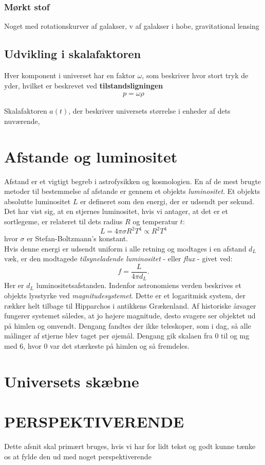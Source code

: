 \subsubsection{Mørkt stof}
Noget med rotationskurver af galakser, v af galakser i hobe, gravitational lensing

\subsection{Udvikling i skalafaktoren}
Hver komponent i universet har en faktor $\omega$, som beskriver hvor stort tryk de yder, hvilket er beskrevet ved \textbf{tilstandsligningen}
\begin{align}
	p=\omega \rho
\end{align}

Skalafaktoren $a(t)$, der beskriver universets størrelse i enheder af dets nuværende, 

\section{Afstande og luminositet}
Afstand er et vigtigt begreb i astrofysikken og kosmologien. En af de mest brugte metoder til bestemmelse af afstande er gennem et objekts \textit{luminositet}. Et objekts absolutte luminositet $L$ er defineret som den energi, der er udsendt per sekund. Det har vist sig, at en stjernes luminositet, hvis vi antager, at det er et sortlegeme, er relateret til dets radius $R$ og temperatur $t$:
\begin{equation}
L = 4\pi\sigma R^2T^4 \propto R^2 T^4
\end{equation}
hvor $\sigma$ er Stefan-Boltzmann's konstant. \\
Hvis denne energi er udsendt uniform i alle retning og modtages i en afstand $d_L$ væk, er den modtagede \textit{tilsyneladende luminositet} - eller \textit{flux} - givet ved:
\begin{equation}
f = \frac{L}{4\pi d_L}.
\end{equation}
Her er $d_L$ luminositetsafstanden. Indenfor astronomiens verden beskrives et objekts lysstyrke ved \textit{magnitudesystemet}. Dette er et logaritmisk system, der rækker helt tilbage til Hipparchos i antikkens Grækenland. Af historiske årsager fungerer systemet således, at jo højere magnitude, desto svagere ser objektet ud på himlen og omvendt. Dengang fandtes der ikke teleskoper, som i dag, så alle målinger af stjerne blev taget per øjemål. Dengang gik skalaen fra 0 til og mg med 6, hvor 0 var det stærkeste på himlen og så fremdeles. 

\section{Universets skæbne}

\section{PERSPEKTIVERENDE}
Dette afsnit skal primært bruges, hvis vi har for lidt tekst og godt kunne tænke os at fylde den ud med noget perspektiverende 